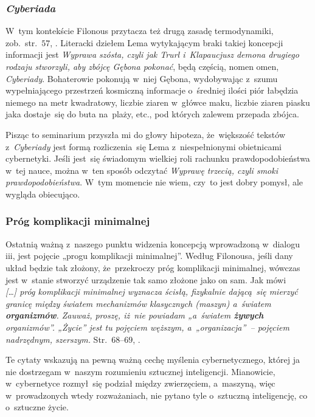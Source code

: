\documentclass[10pt,t]{beamer}
\begin{document}
\begin{frame}
  \frametitle{\textit{Cyberiada}}


  W~tym kontekście Filonous przytacza też drugą zasadę termodynamiki,
  zob.~str.~$57$, \parencite{Lem-Dialogi-Vol-I-Pub-1996}. Literacki
  dziełem Lema wytykającym braki takiej koncepcji informacji jest
  \textit{Wyprawa szósta, czyli jak Trurl i~Klapaucjusz demona drugiego
    rodzaju stworzyli, aby zbójcę Gębona pokonać}, będą częścią,
  nomen omen, \textit{Cyberiady}. Bohaterowie pokonują w~niej Gębona,
  wydobywając z~szumu wypełniającego przestrzeń kosmiczną informacje
  o~średniej ilości piór łabędzia niemego na metr kwadratowy, liczbie
  ziaren w~główce maku, liczbie ziaren piasku jaka dostaje~się do buta
  na~plaży, etc., pod których zalewem przepada zbójca.


  Pisząc to seminarium przyszła mi do głowy hipoteza, że~większość tekstów
  z~\textit{Cyberiady} jest formą rozliczenia~się Lema z~niespełnionymi
  obietnicami cybernetyki. Jeśli jest~się świadomym wielkiej roli
  rachunku prawdopodobieństwa w~tej nauce, można w~ten sposób odczytać
  \textit{Wyprawę trzecią, czyli smoki prawdopodobieństwa}. W~tym momencie
  nie wiem, czy~to jest dobry pomysł, ale wygląda obiecująco.

\end{frame}





\begin{frame}
  \frametitle{Próg komplikacji minimalnej}


  Ostatnią ważną z~naszego punktu widzenia koncepcją wprowadzoną w~dialogu
  iii, jest pojęcie „progu komplikacji minimalnej”. Według Filonousa, jeśli
  dany układ będzie tak złożony, że~przekroczy próg komplikacji minimalnej,
  wówczas jest w~stanie stworzyć urządzenie tak samo złożone jako on sam.
  Jak mówi \\
  \textit{[\ldots] próg komplikacji minimalnej wyznacza ścisłą, fizykalnie
    dającą~się mierzyć granicę między światem mechanizmów klasycznych
    (maszyn) a~światem \textbf{organizmów}. Zauważ, proszę, iż~nie powiadam
    „a~światem \textbf{żywych} organizmów”. „Życie” jest tu pojęciem
    węższym, a~„organizacja”~-- pojęciem nadrzędnym, szerszym.}
  Str.~$68\text{--}69$, \parencite{Lem-Dialogi-Vol-I-Pub-1996}.

  Te cytaty wskazują na pewną ważną cechę myślenia cybernetycznego, której
  ja nie dostrzegam w~naszym rozumieniu sztucznej inteligencji. Mianowicie,
  w~cybernetyce rozmył~się podział między zwierzęciem, a~maszyną, więc
  w~prowadzonych wtedy rozważaniach, nie pytano tyle o~sztuczną
  inteligencję, co o~\alert{sztuczne życie}.

\end{frame}
\end{document}

